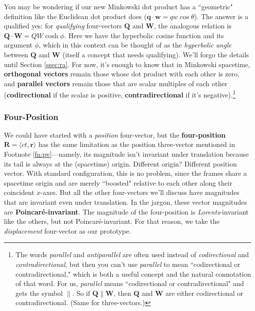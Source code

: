 \documentclass[12pt]{article}
\renewcommand{\vv}[1]{\mathbf{#1}}
\begin{document}
You may be wondering if our new Minkowski dot product has a ``geometric" definition like the Euclidean dot product does ($\vv q \cdot \vv w = qw \cos \theta$). The answer is a qualified yes: for \emph{qualifying} four-vectors $\vv Q$ and $\vv W$, the analogous relation is $\vv Q \cdot \vv W = QW \cosh \phi$. Here we have the hyperbolic cosine function and its argument $\phi$, which in this context can be thought of as the \emph{hyperbolic angle} between $\vv Q$ and $\vv W$ (itself a concept that needs qualifying). We'll forgo the details until Section \ref{ssec:ra}. For now, it's enough to know that in Minkowski spacetime, \textbf{orthogonal vectors} remain those whose dot product with each other is zero, and \textbf{parallel vectors} remain those that are scalar multiples of each other (\textbf{codirectional} if the scalar is positive, \textbf{contradirectional} if it's negative).\footnote{The words \emph{parallel} and \emph{antiparallel} are often used instead of \emph{codirectional} and \emph{contradirectional}, but then you can't use \emph{parallel} to mean ``codirectional or contradirectional," which is both a useful concept and the natural connotation of that word. For us, \emph{parallel} means ``codirectional or contradirectional" and gets the symbol $\parallel$. So if $\vv Q \parallel \vv W$, then $\vv Q$ and $\vv W$ are either codirectional or contradirectional. (Same for three-vectors.)}


\subsubsection{Four-Position}

We could have started with a \emph{position} four-vector, but the \textbf{four-position} $\vv R = \langle ct, \vv r \rangle$ has the same limitation as the position three-vector mentioned in Footnote \ref{fn:pv}---namely, its magnitude isn't invariant under translation because its tail is always at the (spacetime) origin. Different origin? Different position vector. With standard configuration, this is no problem, since the frames share a spacetime origin and are merely ``boosted" relative to each other along their coincident $x$-axes. But all the other four-vectors we'll discuss have magnitudes that are invariant even under translation. In the jargon, these vector magnitudes are \textbf{Poincar\'e-invariant}. The magnitude of the four-position is \emph{Lorentz}-invariant like the others, but not Poincar\'e-invariant. For that reason, we take the \emph{displacement} four-vector as our prototype.
\end{document}
